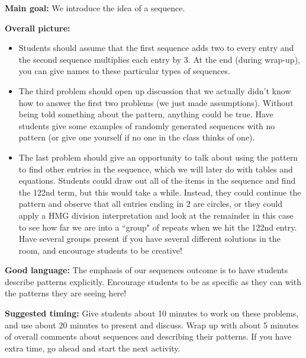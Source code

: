 \documentclass[noauthor,nooutcomes,handout]{ximera}
\begin{document}
\begin{instructorNotes}

{\bf Main goal:} We introduce the idea of a sequence.

{\bf Overall picture:} 

\begin{itemize}
	\item Students should assume that the first sequence adds two to every entry and the second sequence multiplies each entry by $3$. At the end (during wrap-up), you can give names to these particular types of sequences.
	\item The third problem should open up discussion that we actually didn't know how to answer the first two problems (we just made assumptions). Without being told something about the pattern, anything could be true. Have students give some examples of randomly generated sequences with no pattern (or give one yourself if no one in the class thinks of one).
	\item The last problem should give an opportunity to talk about using the pattern to find other entries in the sequence, which we will later do with tables and equations. Students could draw out all of the items in the sequence and find the 122nd term, but this would take a while. Instead, they could continue the pattern and observe that all entries ending in $2$ are circles, or they could apply a HMG division interpretation and look at the remainder in this case to see how far we are into a ``group" of repeats when we hit the 122nd entry. Have several groups present if you have several different solutions in the room, and encourage students to be creative!
\end{itemize}



{\bf Good language:} The emphasis of our sequences outcome is to have students describe patterns explicitly. Encourage students to be as specific as they can with the patterns they are seeing here!

{\bf Suggested timing:} Give students about 10 minutes to work on these problems, and use about 20 minutes to present and discuss. Wrap up with about 5 minutes of overall comments about sequences and describing their patterns. If you have extra time, go ahead and start the next activity.


\end{instructorNotes}
\end{document}
